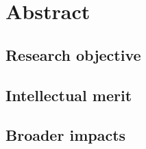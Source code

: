 \section{Abstract}

\subsection{Research objective}

\subsection{Intellectual merit}

\subsection{Broader impacts}